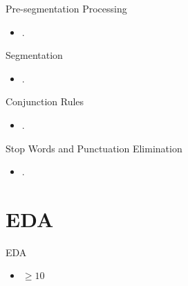 \documentclass[12pt, trans]{beamer}
\newcommand{\1}[1]{{\mathbf 1}\left\{#1\right\}}        %
\begin{document}
\begin{frame}{Pre-segmentation Processing}

\begin{itemize}[<+->]
\item .
\end{itemize}

\end{frame}


\begin{frame}{Segmentation}

\begin{itemize}[<+->]
\item  .
\end{itemize}

\end{frame}

\begin{frame}{Conjunction Rules}

\begin{itemize}[<+->]
\item  .
\end{itemize}

\end{frame}

\begin{frame}{Stop Words and Punctuation Elimination}

\begin{itemize}[<+->]
\item .
\end{itemize}

\end{frame}



\section{EDA}

\begin{frame}{EDA}

\begin{itemize}[<+->]
\item $\geq 10$
\end{itemize}

\end{frame}



\end{document}

